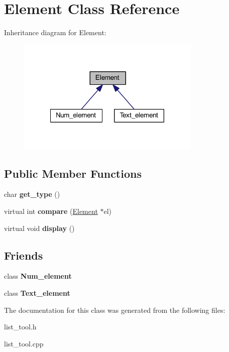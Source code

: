 \hypertarget{class_element}{\section{Element Class Reference}
\label{d5/d50/class_element}
}


Inheritance diagram for Element\-:\nopagebreak
\begin{figure}[H]
\begin{center}
\leavevmode
\includegraphics[width=249pt]{df/d0d/class_element__inherit__graph}
\end{center}
\end{figure}
\subsection*{Public Member Functions}
\begin{DoxyCompactItemize}
\item 
\hypertarget{class_element_a7e572183ea4b57781a9d896caaafbf2f}{char {\bfseries get\-\_\-type} ()}\label{d5/d50/class_element_a7e572183ea4b57781a9d896caaafbf2f}

\item 
\hypertarget{class_element_a07bbee15ca80992dec60254fac6b004e}{virtual int {\bfseries compare} (\hyperlink{class_element}{Element} $\ast$el)}\label{d5/d50/class_element_a07bbee15ca80992dec60254fac6b004e}

\item 
\hypertarget{class_element_a104b244ec65250b42d6d6713393684e0}{virtual void {\bfseries display} ()}\label{d5/d50/class_element_a104b244ec65250b42d6d6713393684e0}

\end{DoxyCompactItemize}
\subsection*{Friends}
\begin{DoxyCompactItemize}
\item 
\hypertarget{class_element_a8332d6f5b691636d30b5c7a91addf247}{class {\bfseries Num\-\_\-element}}\label{d5/d50/class_element_a8332d6f5b691636d30b5c7a91addf247}

\item 
\hypertarget{class_element_af2cc0329ecc045324a0815c7d55b79f5}{class {\bfseries Text\-\_\-element}}\label{d5/d50/class_element_af2cc0329ecc045324a0815c7d55b79f5}

\end{DoxyCompactItemize}


The documentation for this class was generated from the following files\-:\begin{DoxyCompactItemize}
\item 
list\-\_\-tool.\-h\item 
list\-\_\-tool.\-cpp\end{DoxyCompactItemize}
